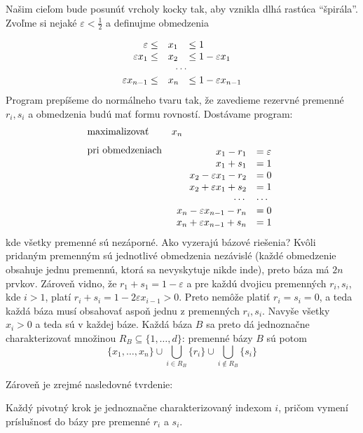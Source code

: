 \noindent
Našim cieľom bude posunúť  vrcholy kocky tak, aby vznikla dlhá
rastúca ``špirála''. Zvoľme si nejaké $\varepsilon<\frac{1}{2}$ a definujme obmedzenia

$$
\begin{array}{rll}
  \varepsilon\le &x_1& \le 1\\
  \varepsilon x_1\le &x_2& \le 1-\varepsilon x_1\\
  \multicolumn{3}{c}{\cdots}\\
  \varepsilon x_{n-1}\le &x_n& \le 1-\varepsilon x_{n-1}
\end{array}
$$
Program prepíšeme do normálneho tvaru tak, že zavedieme rezervné premenné $r_i, s_i$ a obmedzenia budú mať formu 
rovností. Dostávame program:
\begin{equation}
\label{eq:simplex:exp:1}
\begin{array}{ll}
  \text{maximalizovať} & x_n\\
  \vtop{\null\hbox{\text{pri obmedzeniach}}} & \vtop{\null\hbox{$\begin{array}{rl}
  x_1-r_1 &=\varepsilon\\
  x_1+s_1 &=1\\
  x_2 - \varepsilon x_1 - r_2 &=0\\
  x_2 + \varepsilon x_1 + s_2 &=1\\
  \cdots&\cdots\\
  x_n - \varepsilon x_{n-1} - r_n &=0\\
  x_n + \varepsilon x_{n-1} + s_n &=1
\end{array}$}}\\
\end{array}
\end{equation}
kde všetky premenné sú nezáporné. 
Ako vyzerajú bázové riešenia?
Kvôli pridaným premenným sú jednotlivé obmedzenia nezávislé (každé obmedzenie obsahuje jednu premennú, ktorá
sa nevyskytuje nikde inde), preto báza má $2n$ prvkov.
Zároveň vidno, že $r_1+s_1=1-\varepsilon$ 
a pre každú dvojicu
premenných $r_i, s_i$, kde $i>1$, platí $r_i+s_i=1-2\varepsilon x_{i-1}>0$. Preto nemôže platiť $r_i=s_i=0$,
a teda každá báza musí obsahovať aspoň jednu z premenných $r_i, s_i$.
Navyše všetky $x_i>0$ a teda sú  v každej báze. 
Každá báza $B$ sa preto dá jednoznačne charakterizovať
množinou $R_B\subseteq\{1,\ldots,d\}$:  premenné bázy $B$ sú potom
$$\{x_1,\ldots,x_n\}\cup\bigcup\limits_{i\in R_B}\{r_i\}\cup\bigcup\limits_{i\not\in R_B}\{s_i\}$$ 

\noindent
Zároveň je zrejmé nasledovné tvrdenie:
\begin{clm}
  \label{clm:simplex:exp:1}
  Každý pivotný krok je jednoznačne charakterizovaný indexom $i$, pričom 
  vymení príslušnosť do bázy pre premenné $r_i$ a $s_i$.
\end{clm}

